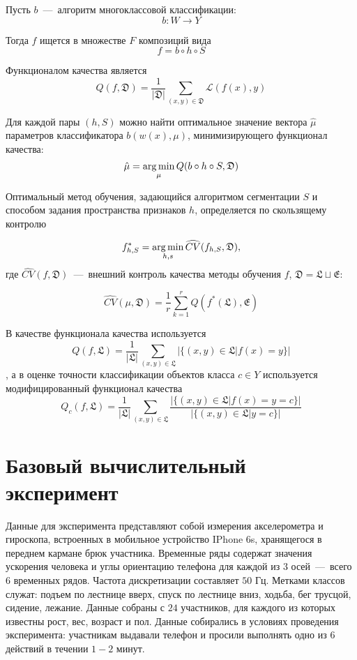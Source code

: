 \documentclass[12pt, twoside]{article}
\begin{document}
Пусть $b$~---~алгоритм многоклассовой классификации: $$b:W\rightarrow Y$$

Тогда $f$ ищется в множестве $F$ композиций вида $$f=b\circ h\circ S$$

Функционалом качества является $$Q(f,\mathfrak{D})=\frac{1}{|\mathfrak{D}|}\sum\limits_{(x,y)\in\mathfrak{D}}\mathscr{L}(f(x),y)$$

Для каждой пары $(h,S)$ можно найти оптимальное значение вектора $\hat\mu$ параметров классификатора $b(w(x),\mu)$, минимизирующего функционал качества: $$\hat\mu=\argmin_\mu Q(b\circ h\circ S,\mathfrak{D})$$

Оптимальный метод обучения, задающийся алгоритмом сегментации $S$ и способом задания пространства признаков $h$, определяется по скользящему контролю

$$f_{h,S}^*=\argmin\limits_{h,s}\widehat{CV}(f_{h,S},\mathfrak{D}),$$ где $\widehat{CV}(f,\mathfrak{D})$~---~внешний контроль качества методы обучения $f$, $\mathfrak{D}=\mathfrak{L}\sqcup\mathfrak{E}$:
 
$$\widehat{CV}(\mu, \mathfrak{D})=\frac{1}{r}\sum\limits_{k=1}^r Q(f^*(\mathfrak{L}),\mathfrak{E})$$

В качестве функционала качества используется $$Q(f,\mathfrak{L})=\frac{1}{|\mathfrak{L}|}\sum\limits_{(x,y)\in\mathfrak{L}}|\{(x,y)\in\mathfrak{L}|f(x)=y\}|$$, а в оценке точности классификации объектов класса $c\in Y$ используется модифицированный функционал качества $$Q_c(f,\mathfrak{L})=\frac{1}{|\mathfrak{L}|}\sum\limits_{(x,y)\in\mathfrak{L}}\frac{|\{(x,y)\in\mathfrak{L}|f(x)=y=c\}|}{|\{(x,y)\in\mathfrak{L}|y=c\}|}$$

\section{Базовый вычислительный эксперимент}

Данные для эксперимента представляют собой измерения акселерометра и гироскопа, встроенных в мобильное устройство IPhone 6s, хранящегося в переднем кармане брюк участника. Временные ряды содержат значения ускорения человека и углы ориентацию телефона для каждой из $3$ осей~---~всего $6$ временных рядов. Частота дискретизации составляет $50$ Гц. Метками классов служат: подъем по лестнице вверх, спуск по лестнице вниз, ходьба, бег трусцой, сидение, лежание. Данные собраны с $24$ участников, для каждого из  которых известны рост, вес, возраст и пол. Данные собирались в условиях проведения эксперимента: участникам выдавали телефон и просили выполнять одно из $6$ действий в течении $1-2$ минут.
\end{document}
